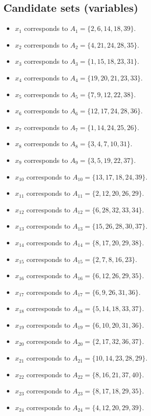 \documentclass[11pt]{article}
\begin{document}
\subsection*{Candidate sets (variables)}
\begin{itemize}
\item $x_{1}$ corresponds to $A_{1}=\{2, 6, 14, 18, 39\}$.
\item $x_{2}$ corresponds to $A_{2}=\{4, 21, 24, 28, 35\}$.
\item $x_{3}$ corresponds to $A_{3}=\{1, 15, 18, 23, 31\}$.
\item $x_{4}$ corresponds to $A_{4}=\{19, 20, 21, 23, 33\}$.
\item $x_{5}$ corresponds to $A_{5}=\{7, 9, 12, 22, 38\}$.
\item $x_{6}$ corresponds to $A_{6}=\{12, 17, 24, 28, 36\}$.
\item $x_{7}$ corresponds to $A_{7}=\{1, 14, 24, 25, 26\}$.
\item $x_{8}$ corresponds to $A_{8}=\{3, 4, 7, 10, 31\}$.
\item $x_{9}$ corresponds to $A_{9}=\{3, 5, 19, 22, 37\}$.
\item $x_{10}$ corresponds to $A_{10}=\{13, 17, 18, 24, 39\}$.
\item $x_{11}$ corresponds to $A_{11}=\{2, 12, 20, 26, 29\}$.
\item $x_{12}$ corresponds to $A_{12}=\{6, 28, 32, 33, 34\}$.
\item $x_{13}$ corresponds to $A_{13}=\{15, 26, 28, 30, 37\}$.
\item $x_{14}$ corresponds to $A_{14}=\{8, 17, 20, 29, 38\}$.
\item $x_{15}$ corresponds to $A_{15}=\{2, 7, 8, 16, 23\}$.
\item $x_{16}$ corresponds to $A_{16}=\{6, 12, 26, 29, 35\}$.
\item $x_{17}$ corresponds to $A_{17}=\{6, 9, 26, 31, 36\}$.
\item $x_{18}$ corresponds to $A_{18}=\{5, 14, 18, 33, 37\}$.
\item $x_{19}$ corresponds to $A_{19}=\{6, 10, 20, 31, 36\}$.
\item $x_{20}$ corresponds to $A_{20}=\{2, 17, 32, 36, 37\}$.
\item $x_{21}$ corresponds to $A_{21}=\{10, 14, 23, 28, 29\}$.
\item $x_{22}$ corresponds to $A_{22}=\{8, 16, 21, 37, 40\}$.
\item $x_{23}$ corresponds to $A_{23}=\{8, 17, 18, 29, 35\}$.
\item $x_{24}$ corresponds to $A_{24}=\{4, 12, 20, 29, 39\}$.

\end{itemize}
\end{document}
